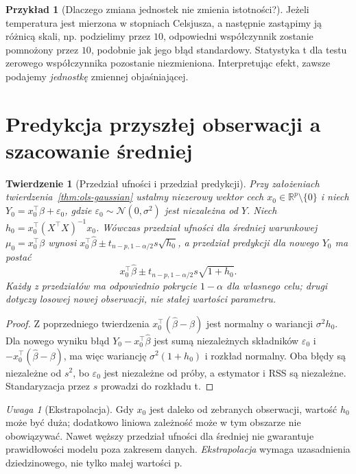 \documentclass[11pt,a4paper,oneside]{report}
\numberwithin{equation}{chapter}
\theoremstyle{plain}
\newtheorem{twierdzenie}{Twierdzenie}[chapter]
\theoremstyle{definition}
\newtheorem{przyklad}{Przykład}[chapter]
\theoremstyle{remark}
\newtheorem{uwaga}{Uwaga}[chapter]
\newcommand{\R}{\mathbb R}
\newcommand{\Normal}{\mathcal N}
\begin{document}
\begin{przyklad}[Dlaczego zmiana jednostek nie zmienia istotności?]
Jeżeli temperatura jest mierzona w stopniach Celsjusza,
a następnie zastąpimy ją różnicą skali, np. podzielimy
przez $10$, odpowiedni współczynnik zostanie pomnożony
przez $10$, podobnie jak jego błąd standardowy.
Statystyka t dla testu zerowego współczynnika pozostanie
niezmieniona. Interpretując efekt, zawsze podajemy
\emph{jednostkę} zmiennej objaśniającej.
\end{przyklad}

\section{Predykcja przyszłej obserwacji a szacowanie średniej}
\begin{twierdzenie}[Przedział ufności i przedział predykcji]
\label{thm:prediction-vs-mean}
Przy założeniach twierdzenia~\ref{thm:ols-gaussian}
ustalmy niezerowy wektor cech $x_0\in\R^p\setminus\{0\}$ i niech
$Y_0=x_0^\top\beta+\varepsilon_0$, gdzie
$\varepsilon_0\sim\Normal(0,\sigma^2)$ jest niezależna
od $Y$. Niech $h_0=x_0^\top(X^\top X)^{-1}x_0$.
Wówczas przedział ufności dla średniej warunkowej
$\mu_0=x_0^\top\beta$ wynosi
$x_0^\top\widehat\beta\pm t_{n-p,1-\alpha/2}s\sqrt{h_0}$,
a przedział predykcji dla nowego $Y_0$ ma postać
\[
 x_0^\top\widehat\beta\pm
 t_{n-p,1-\alpha/2}s\sqrt{1+h_0}.
\]
Każdy z przedziałów ma odpowiednio pokrycie
$1-\alpha$ dla własnego celu; drugi dotyczy \emph{losowej
nowej obserwacji}, nie stałej wartości parametru.
\end{twierdzenie}
\begin{proof}
Z poprzedniego twierdzenia
$x_0^\top(\widehat\beta-\beta)$ jest normalny o
wariancji $\sigma^2h_0$. Dla nowego wyniku błąd
$Y_0-x_0^\top\widehat\beta$ jest sumą niezależnych
składników $\varepsilon_0$ i
$-x_0^\top(\widehat\beta-\beta)$, ma więc wariancję
$\sigma^2(1+h_0)$ i rozkład normalny.
Oba błędy są niezależne od $s^2$, bo $\varepsilon_0$
jest niezależne od próby, a estymator i RSS są niezależne.
Standaryzacja przez $s$ prowadzi do rozkładu t.
\end{proof}

\begin{uwaga}[Ekstrapolacja]
Gdy $x_0$ jest daleko od zebranych obserwacji, wartość
$h_0$ może być duża; dodatkowo liniowa zależność może
w tym obszarze nie obowiązywać. Nawet węższy przedział
ufności dla średniej nie gwarantuje prawidłowości modelu
poza zakresem danych. \emph{Ekstrapolacja} wymaga
uzasadnienia dziedzinowego, nie tylko małej wartości p.
\end{uwaga}
\end{document}
